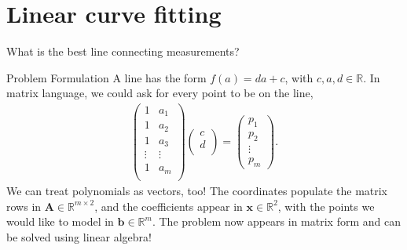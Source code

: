 \documentclass[notes]{beamer}
\begin{document}
  \section{Linear curve fitting}
    \begin{frame}{What is the best line connecting measurements?}
      \begin{figure}
      \centering
      
      \end{figure}
    \end{frame}

    \begin{frame}{Problem Formulation}
      A line has the form $f(a) = da + c$, with $c,a,d \in \mathbb{R}$. In matrix language, we could ask for every point to be on the line,
      \begin{align}
        \begin{pmatrix}
          1 & a_1 \\ 
          1 & a_2 \\
          1 & a_3 \\
          \vdots  & \vdots \\ 
          1 & a_m \\
        \end{pmatrix}
        \begin{pmatrix}
          c \\ d \\
        \end{pmatrix}
        = 
        \begin{pmatrix}
          p_1 \\
          p_2 \\
          \vdots \\ 
          p_m  
        \end{pmatrix}.
      \end{align}
      We can treat polynomials as vectors, too! The coordinates populate the matrix rows in $\mathbf{A} \in \mathbb{R}^{m \times 2}$, and the coefficients
      appear in $\mathbf{x} \in \mathbb{R}^{2}$, with the points we would like to model in $\mathbf{b} \in \mathbb{R}^{m}$.
      The problem now appears in matrix form and can be solved using linear algebra!
    \end{frame}
\end{document}
